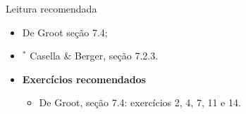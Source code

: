\begin{frame}{Leitura recomendada}
\begin{itemize}
 \item[\faBook] De Groot seção 7.4;
 \item[\faBook] $^\ast$ Casella \& Berger, seção 7.2.3.
 \item {\large\textbf{Exercícios recomendados}}
 \begin{itemize}
  \item[\faBookmark] De Groot, seção 7.4: exercícios 2, 4, 7, 11 e 14.
  \end{itemize}
 \end{itemize} 
\end{frame}


